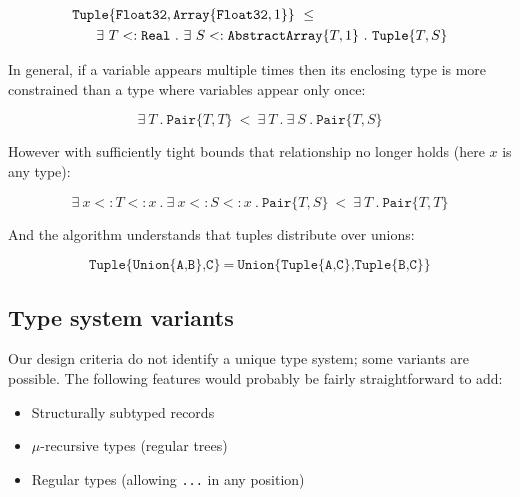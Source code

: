 \vspace{-3ex}
\begin{singlespace}
\begin{align*}
&\texttt{Tuple}\{\texttt{Float32},\texttt{Array}\{\texttt{Float32},1\}\}\ \leq\ \\
&\hspace{4ex}\exists\ T<:\texttt{Real}\ .\ \exists\ S<:\texttt{AbstractArray}\{T,1\}\ .\ \texttt{Tuple}\{T,S\}
\end{align*}
\end{singlespace}


\noindent
In general, if a variable appears multiple times then its enclosing type is
more constrained than a type where variables appear only once:

\vspace{-3ex}
\[
\exists\ T\ .\ \texttt{Pair}\{T,T\}\ <\ \exists\ T\ .\ \exists\ S\ .\ \texttt{Pair}\{T,S\}
\]

\noindent
However with sufficiently tight bounds that relationship no longer holds
(here $x$ is any type):

\vspace{-3ex}
\[
\exists\ x<:T<:x\ .\ \exists\ x<:S<:x\ .\ \texttt{Pair}\{T,S\}\ <\ \exists\ T\ .\ \texttt{Pair}\{T,T\}
\]


\noindent
And the algorithm understands that tuples distribute over unions:

\vspace{-3ex}
\[
\texttt{Tuple\{Union\{A,B\},C\}}\ =\ \texttt{Union\{Tuple\{A,C\},Tuple\{B,C\}\}}
\]

\subsection{Type system variants}

Our design criteria do not identify a unique type system; some
variants are possible.
The following features would probably be fairly straightforward to add:

\vspace{-3ex}
\begin{singlespace}
\begin{itemize}
\item Structurally subtyped records
\item $\mu$-recursive types (regular trees)
\item Regular types (allowing \texttt{...} in any position)
\end{itemize}
\end{singlespace}

